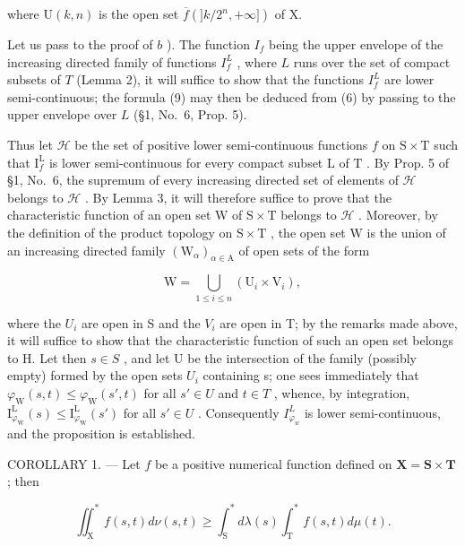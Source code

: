 where \(\mathrm{U}(k,n)\) is the open set \(\overline{f} (]k / 2^n, + \infty ])\) of X.

Let us pass to the proof of \(b\) ). The function \(I_f\) being the upper envelope of the increasing directed family of functions \(I_f^L\) , where \(L\) runs over the set of compact subsets of \(T\) (Lemma 2), it will suffice to show that the functions \(I_f^L\) are lower semi-continuous; the formula (9) may then be deduced from (6) by passing to the upper envelope over \(L\) (§1, No.~6, Prop. 5).

Thus let \(\mathcal{H}\) be the set of positive lower semi-continuous functions \(f\) on \(\mathrm{S} \times \mathrm{T}\) such that \(\mathrm{I}_f^{\mathrm{L}}\) is lower semi-continuous for every compact subset \(\mathrm{L}\) of \(\mathrm{T}\) . By Prop. 5 of §1, No.~6, the supremum of every increasing directed set of elements of \(\mathcal{H}\) belongs to \(\mathcal{H}\) . By Lemma 3, it will therefore suffice to prove that the characteristic function of an open set \(\mathrm{W}\) of \(\mathrm{S} \times \mathrm{T}\) belongs to \(\mathcal{H}\) . Moreover, by the definition of the product topology on \(\mathrm{S} \times \mathrm{T}\) , the open set \(\mathrm{W}\) is the union of an increasing directed family \((\mathrm{W}_{\alpha})_{\alpha \in \mathrm{A}}\) of open sets of the form

\[
\mathrm{W} = \bigcup_ {1 \leqslant i \leqslant n} \left(\mathrm{U} _ {i} \times \mathrm{V} _ {i}\right),
\]

where the \(U_{i}\) are open in S and the \(V_{i}\) are open in T; by the remarks made above, it will suffice to show that the characteristic function of such an open set belongs to H. Let then \(s \in S\) , and let U be the intersection of the family (possibly empty) formed by the open sets \(U_{i}\) containing s; one sees immediately that \(\varphi_{\mathrm{W}}(s,t) \leqslant \varphi_{\mathrm{W}}(s',t)\) for all \(s' \in U\) and \(t \in T\) , whence, by integration, \(\mathrm{I}_{\varphi_{\mathrm{W}}}^{\mathrm{L}}(s) \leqslant \mathrm{I}_{\varphi_{\mathrm{W}}}^{\mathrm{L}}(s')\) for all \(s' \in U\) . Consequently \(I_{\varphi_{w}}^{L}\) is lower semi-continuous, and the proposition is established.

COROLLARY 1. --- Let \(f\) be a positive numerical function defined on \(\mathbf{X} = \mathbf{S} \times \mathbf{T}\) ; then

\[
\iint_ {\mathrm{X}} ^ {*} f (s, t) d \nu (s, t) \geqslant \int_ {\mathrm{S}} ^ {*} d \lambda (s) \int_ {\mathrm{T}} ^ {*} f (s, t) d \mu (t).\tag{10}
\]

